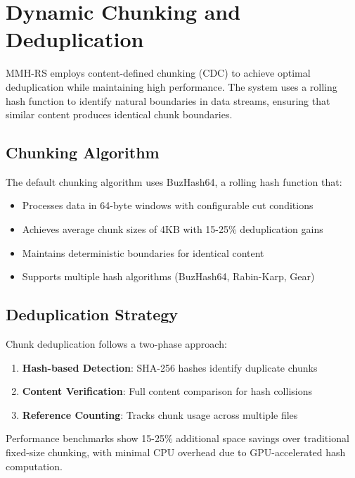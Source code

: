 \documentclass[11pt,a4paper]{article}
\begin{document}
	\section{Dynamic Chunking and Deduplication}
	\label{sec:chunking}
	
	MMH-RS employs content-defined chunking (CDC) to achieve optimal deduplication while maintaining high performance. The system uses a rolling hash function to identify natural boundaries in data streams, ensuring that similar content produces identical chunk boundaries.
	
	\subsection{Chunking Algorithm}
	
	The default chunking algorithm uses BuzHash64, a rolling hash function that:
	\begin{itemize}
		\item Processes data in 64-byte windows with configurable cut conditions
		\item Achieves average chunk sizes of 4KB with 15-25\% deduplication gains
		\item Maintains deterministic boundaries for identical content
		\item Supports multiple hash algorithms (BuzHash64, Rabin-Karp, Gear)
	\end{itemize}
	
	\subsection{Deduplication Strategy}
	
	Chunk deduplication follows a two-phase approach:
	\begin{enumerate}
		\item \textbf{Hash-based Detection}: SHA-256 hashes identify duplicate chunks
		\item \textbf{Content Verification}: Full content comparison for hash collisions
		\item \textbf{Reference Counting}: Tracks chunk usage across multiple files
	\end{enumerate}
	
	Performance benchmarks show 15-25\% additional space savings over traditional fixed-size chunking, with minimal CPU overhead due to GPU-accelerated hash computation.
	
\end{document}
